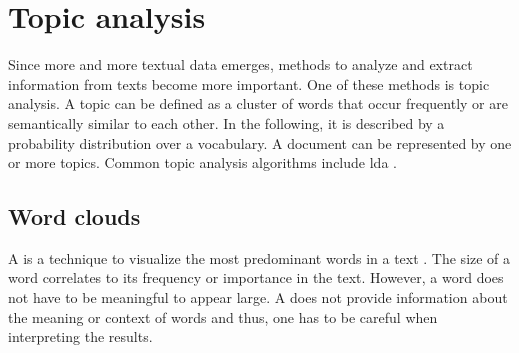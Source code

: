 \section{Topic analysis}\label{sec:topic-modeling}

Since more and more textual data emerges, methods to analyze and extract information from texts become more important.
One of these methods is topic analysis.
A topic can be defined as a cluster of words that occur frequently or are semantically similar to each other.
In the following, it is described by a probability distribution over a vocabulary.
A document can be represented by one or more topics. %
Common topic analysis algorithms include \ac{lda} \cite{topic_modeling2015}.







\subsection{Word clouds}\label{subsec:word-clouds}

A \wordcloud{} is a technique to visualize the most predominant words in a text \cite{topic_modeling2019}.
The size of a word correlates to its frequency or importance in the text.
However, a word does not have to be meaningful to appear large.
A \wordcloud{} does not provide information about the meaning or context of words and thus, 
one has to be careful when interpreting the results.